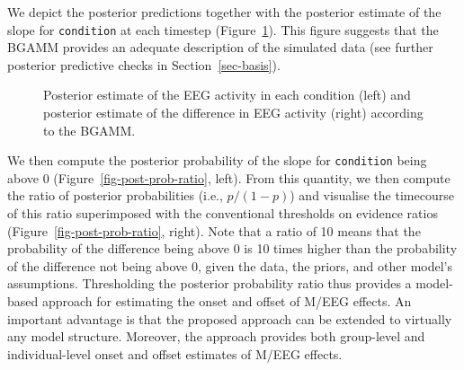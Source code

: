 \documentclass[
  doc,
  floatsintext,
  longtable,
  a4paper,
  nolmodern,
  notxfonts,
  notimes,
  donotrepeattitle,
  colorlinks=true,linkcolor=blue,citecolor=blue,urlcolor=blue]{apa7}
\begin{document}
We depict the posterior predictions together with the posterior estimate
of the slope for \texttt{condition} at each timestep
(Figure~\ref{fig-plot-post-slope}). This figure suggests that the BGAMM
provides an adequate description of the simulated data (see further
posterior predictive checks in Section~\ref{sec-basis}).

\begin{figure}[!htb]

\caption{\label{fig-plot-post-slope}Posterior estimate of the EEG
activity in each condition (left) and posterior estimate of the
difference in EEG activity (right) according to the BGAMM.}


\end{figure}%

We then compute the posterior probability of the slope for
\texttt{condition} being above \(0\) (Figure~\ref{fig-post-prob-ratio},
left). From this quantity, we then compute the ratio of posterior
probabilities (i.e., \(p/(1-p)\)) and visualise the timecourse of this
ratio superimposed with the conventional thresholds on evidence ratios
(Figure~\ref{fig-post-prob-ratio}, right). Note that a ratio of 10 means
that the probability of the difference being above 0 is 10 times higher
than the probability of the difference not being above 0, given the
data, the priors, and other model's assumptions. Thresholding the
posterior probability ratio thus provides a model-based approach for
estimating the onset and offset of M/EEG effects. An important advantage
is that the proposed approach can be extended to virtually any model
structure. Moreover, the approach provides both group-level and
individual-level onset and offset estimates of M/EEG effects.
\end{document}
